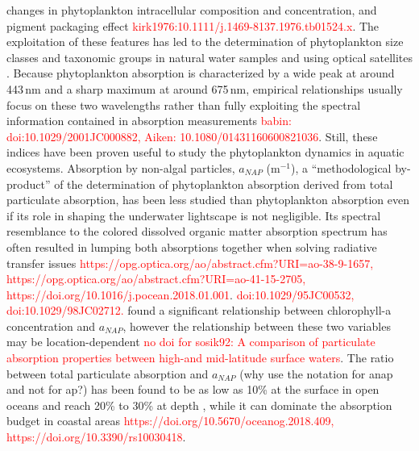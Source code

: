 \documentclass[utf8]{frontiersSCNS} %
\begin{document}
changes in phytoplankton intracellular composition and concentration, and pigment packaging effect \citep{duysens1956,mitchell1988,kirk1975,Bricaud1995, Bricaud2004, jarrete la vérification des références ici c'est trop compliqué. Je dois regarder à chaque fois 1 par 1 voir quelle bibtext entry est manquante}\textcolor{red}{kirk1976:10.1111/j.1469-8137.1976.tb01524.x}. The exploitation of these features has led to the determination of phytoplankton size classes and taxonomic groups in natural water samples and using optical satellites \citep{Ciotti2002,Devred2006,Devred2011, Fujiki2002, Sathyendranath2004, Brewin2011}. Because phytoplankton absorption is characterized by a wide peak at around 443\,nm and a sharp maximum at around 675\,nm, empirical relationships usually focus on these two wavelengths rather than fully exploiting the spectral information contained in absorption measurements \citep{babin2003,Bricaud1995,aiken2007} \textcolor{red}{babin:  doi:10.1029/2001JC000882, Aiken: 10.1080/01431160600821036}. Still, these indices have been proven useful to study the phytoplankton dynamics in aquatic ecosystems. Absorption by non-algal particles, $a_{NAP}$ (m$^{-1}$), a ``methodological by-product'' of the determination of phytoplankton absorption derived from total particulate absorption, has been less studied than phytoplankton absorption even if its role in shaping the underwater lightscape is not negligible. Its spectral resemblance to the colored dissolved organic matter absorption spectrum has often resulted in lumping both absorptions together when solving radiative transfer issues \citep{hoge1996,maritorena2002,werdell2018} \textcolor{red}{https://opg.optica.org/ao/abstract.cfm?URI=ao-38-9-1657,  https://opg.optica.org/ao/abstract.cfm?URI=ao-41-15-2705, https://doi.org/10.1016/j.pocean.2018.01.001}. \cite{bricaud1998} \textcolor{red}{doi:10.1029/95JC00532, doi:10.1029/98JC02712.} found a significant relationship between chlorophyll-a concentration and $a_{NAP}$, however the relationship between these two variables may be location-dependent \citep{sosik1992,} \textcolor{red}{no doi for sosik92: A comparison of particulate absorption properties between high-and mid-latitude surface waters}. The ratio between total particulate absorption and $a_{NAP}$ (why use the notation for anap and not for ap?) has been found to be as low as 10\% at the surface in open oceans and reach 20\% to 30\% at depth \citep{bricaud1998}, while it can dominate the absorption budget in coastal areas \citep{babin2003,williams2018,kratzer2018} \textcolor{red}{https://doi.org/10.5670/oceanog.2018.409, https://doi.org/10.3390/rs10030418}.
\end{document}
